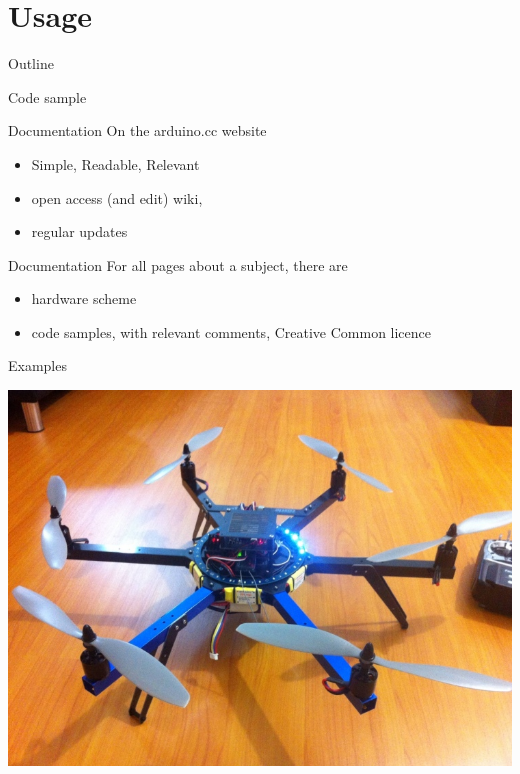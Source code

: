 \section{Usage}

\begin{frame}{Outline}
    \tableofcontents [current]
\end{frame}

\begin{frame} {Code sample}
%	 
%	 
\end {frame}

\begin{frame} {Documentation}
	On the arduino.cc website
	\begin{itemize}
		\item Simple, Readable, Relevant 
		\item open access (and edit) wiki, 
		\item regular updates
	\end{itemize}
\end{frame}

\begin {frame} {Documentation}
	For all pages about a subject, there are
	\begin{itemize}
		\item hardware scheme
		\item code samples, with relevant comments, Creative Common licence
	\end{itemize}
\end {frame}

\begin {frame} {Examples}
	\begin {center}
		\includegraphics [width=.7\textwidth,keepaspectratio] {img/drone}
	\end {center}
\end {frame}


